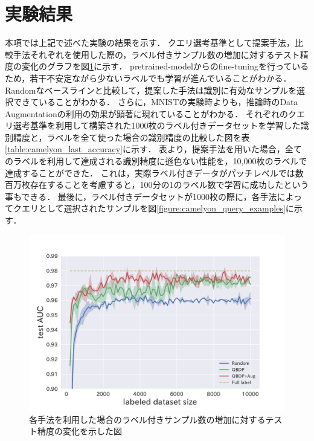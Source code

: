 \section{実験結果}
本項では上記で述べた実験の結果を示す．
クエリ選考基準として提案手法，比較手法それぞれを使用した際の，ラベル付きサンプル数の増加に対するテスト精度の変化のグラフを図\ref{fig:camelyon_acc_graph}に示す．
pretrained-modelからのfine-tuningを行っているため，若干不安定ながら少ないラベルでも学習が進んでいることがわかる．
Randomなベースラインと比較して，提案した手法は識別に有効なサンプルを選択できていることがわかる．
さらに，MNISTの実験時よりも，推論時のData Augmentationの利用の効果が顕著に現れていることがわかる．
それぞれのクエリ選考基準を利用して構築された1000枚のラベル付きデータセットを学習した識別精度と，ラベルを全て使った場合の識別精度の比較した図を表\ref{table:camelyon_last_accuracy}に示す．
表より，提案手法を用いた場合，全てのラベルを利用して達成される識別精度に遜色ない性能を，10,000枚のラベルで達成することができた．
これは，実際ラベル付きデータがパッチレベルでは数百万枚存在することを考慮すると，100分の1のラベル数で学習に成功したという事もできる．
最後に，ラベル付きデータセットが1000枚の際に，各手法によってクエリとして選択されたサンプルを図\ref{figure:camelyon_query_examples}に示す．

\begin{figure}[tbp]
     \begin{center}
      \includegraphics[width=12cm]{figures/camelyon_acc_graph.pdf}
     \end{center}
    \caption{\label{fig:camelyon_acc_graph}各手法を利用した場合のラベル付きサンプル数の増加に対するテスト精度の変化を示した図}
\end{figure}

